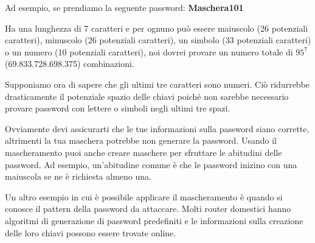 Ad esempio, se prendiamo la seguente password: \textbf{Maschera101}

Ha una lunghezza di 7 caratteri e per ognuno può essere maiuscolo (26 potenziali caratteri), minuscolo (26 potenziali caratteri), un simbolo (33 potenziali caratteri) o un numero (10 potenziali caratteri), noi dovrei provare un numero totale di \({95}^{7}\) (69.833.728.698.375) combinazioni.

Supponiamo ora di sapere che gli ultimi tre caratteri sono numeri. Ciò ridurrebbe drasticamente il potenziale spazio delle chiavi poiché non sarebbe necessario provare password con lettere o simboli negli ultimi tre spazi.

Ovviamente devi assicurarti che le tue informazioni sulla password siano corrette, altrimenti la tua maschera potrebbe non generare la password. Usando il mascheramento puoi anche creare maschere per sfruttare le abitudini delle password. Ad esempio, un'abitudine comune è che le password inizino con una maiuscola se ne è richiesta almeno una.

Un altro esempio in cui è possibile applicare il mascheramento è quando si conosce il pattern della password da attaccare. Molti router domestici hanno algoritmi di generazione di password predefiniti e le informazioni sulla creazione delle loro chiavi possono essere trovate online.